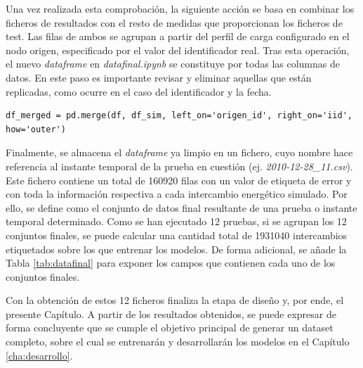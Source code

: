 \vspace{3mm}

Una vez realizada esta comprobación, la siguiente acción se basa en combinar los ficheros de resultados con el resto de medidas que proporcionan los ficheros de test. Las filas de ambos se agrupan a partir del perfil de carga configurado en el nodo origen, especificado por el valor del identificador real. Tras esta operación, el nuevo \textit{dataframe} en \textit{datafinal.ipynb} se constituye por todas las columnas de datos. En este paso es importante revisar y eliminar aquellas que están replicadas, como ocurre en el caso del identificador y la fecha. 

\vspace{3mm}

\begin{lstlisting}[style=Python, caption={Combinación de ficheros de resultados y de test}]
    df_merged = pd.merge(df, df_sim, left_on='origen_id', right_on='iid', how='outer')
\end{lstlisting}

\vspace{3mm}

Finalmente, se almacena el \textit{dataframe} ya limpio en un fichero, cuyo nombre hace referencia al instante temporal de la prueba en cuestión (ej. \textit{2010-12-28\_11.csv}). Este fichero contiene un total de 160920 filas con un valor de etiqueta de error y con toda la información respectiva a cada intercambio energético simulado. Por ello, se define como el conjunto de datos final resultante de una prueba o instante temporal determinado. Como se han ejecutado 12 pruebas, si se agrupan los 12 conjuntos finales, se puede calcular una cantidad total de 1931040 intercambios etiquetados sobre los que entrenar los modelos. De forma adicional, se añade la Tabla \ref{tab:datafinal} para exponer los campos que contienen cada uno de los conjuntos finales.

\vspace{3mm}

Con la obtención de estos 12 ficheros finaliza la etapa de diseño y, por ende, el presente Capítulo. A partir de los resultados obtenidos, se puede expresar de forma concluyente que se cumple el objetivo principal de generar un dataset completo, sobre el cual se entrenarán y desarrollarán los modelos en el Capítulo \ref{cha:desarrollo}. 

